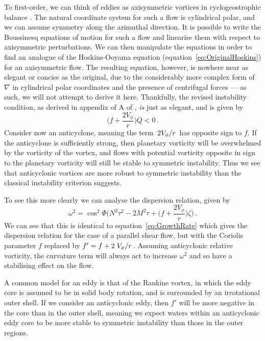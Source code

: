 To first-order, we can think of eddies as axisymmetric vortices in cyclogeostrophic balance \citep{Castelao2011}. The natural coordinate system for such a flow is cylindrical polar, and we can assume symmetry along the azimuthal direction. It is possible to write the Boussinesq equations of motion for such a flow and linearise them with respect to axisymmetric perturbations. We can then manipulate the equations in order to find an analogue of the Hoskins-Ooyama equation (equation~\ref{eq:OriginalHoskins}) for an axisymmetric flow. The resulting equation, however, is nowhere near as elegant or concise as the original, due to the considerably more complex form of $\nabla$ in cylindrical polar coordinates and the presence of centrifugal forces --- as such, we will not attempt to derive it here. Thankfully, the revised instability condition, as derived in appendix of A of \citet{Buckingham2021}, \textit{is} just as elegant, and is given by
\begin{equation}
    \bigg(f + \frac{2 V_\phi}{r}\bigg)Q < 0 \, .
\end{equation}
Consider now an anticyclone, meaning the term $\flatfrac{2V_\phi}{r}$ has opposite sign to $f$. If the anticyclone is sufficiently strong, then planetary vorticity will be overwhelmed by the vorticity of the vortex, and flows with potential vorticity opposite in sign to the planetary vorticity will still be stable to symmetric instability. Thus we see that anticyclonic vortices are more robust to symmetric instability than the classical instability criterion suggests.

To see this more clearly we can analyse the dispersion relation, given by
\begin{equation}
    \label{eq:GrowthRateCurv}
    \omega^2 = \cos^2\Phi \Bigg(N^2 \tau^2 - 2M^2\tau + \bigg(f + \frac{2V_\phi}{r}\bigg)\zeta\Bigg) \, .
\end{equation}
We can see that this is identical to equation~\ref{eq:GrowthRate} which gives the dispersion relation for the case of a parallel shear flow, but with the Coriolis parameter $f$ replaced by $f' = f + 2 \flatfrac{V_\phi}{r}$. Assuming anticyclonic relative vorticity, the curvature term will always act to increase $\omega^2$ and so have a stabilising effect on the flow.

A common model for an eddy is that of the Rankine vortex, in which the eddy core is assumed to be in solid body rotation, and is surrounded by an irrotational outer shell. If we consider an anticyclonic eddy, then $f'$ will be more negative in the core than in the outer shell, meaning we expect waters within an anticyclonic eddy core to be more stable to symmetric instability than those in the outer regions.

